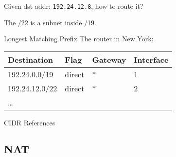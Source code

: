 \begin{frame}
  \begin{block}{Given dst addr: \texttt{192.24.12.8}, how to route it?}
    \begin{center}
    \end{center}
    The /22 is a subnet inside /19.
  \end{block}  
  \begin{block}{Longest Matching Prefix}
    The router in New York:
    \begin{center}
      \small\ttfamily
      \begin{tabular}{llll}
        \toprule
        Destination&Flag&Gateway&Interface\\\midrule
        192.24.0.0/19&direct&*&1\\
        192.24.12.0/22&direct&*&2\\
        \ldots&&&\\\bottomrule
      \end{tabular}
    \end{center}
  \end{block}
\end{frame}



\begin{frame}{CIDR References}
  \begin{refsection}
    \nocite{wiki:cidr, rfc4632} \printbibliography[heading=none]
  \end{refsection}
\end{frame}

\subsection{NAT}

